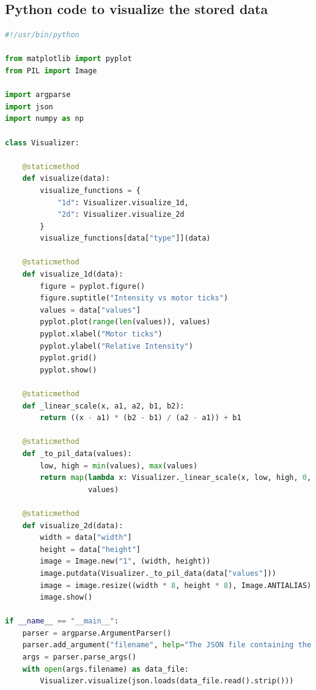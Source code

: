 \documentclass[letterpaper, 12pt]{article}
\begin{document}
\subsection{Python code to visualize the stored data}
\begin{lstlisting}[language=Python]
#!/usr/bin/python

from matplotlib import pyplot
from PIL import Image

import argparse
import json
import numpy as np

class Visualizer:

    @staticmethod
    def visualize(data):
        visualize_functions = {
            "1d": Visualizer.visualize_1d,
            "2d": Visualizer.visualize_2d
        }
        visualize_functions[data["type"]](data)

    @staticmethod
    def visualize_1d(data):
        figure = pyplot.figure()
        figure.suptitle("Intensity vs motor ticks")
        values = data["values"]
        pyplot.plot(range(len(values)), values)
        pyplot.xlabel("Motor ticks")
        pyplot.ylabel("Relative Intensity")
        pyplot.grid()
        pyplot.show()

    @staticmethod
    def _linear_scale(x, a1, a2, b1, b2):
        return ((x - a1) * (b2 - b1) / (a2 - a1)) + b1

    @staticmethod
    def _to_pil_data(values):
        low, high = min(values), max(values)
        return map(lambda x: Visualizer._linear_scale(x, low, high, 0, 255),
                   values)

    @staticmethod
    def visualize_2d(data):
        width = data["width"]
        height = data["height"]
        image = Image.new("1", (width, height))
        image.putdata(Visualizer._to_pil_data(data["values"]))
        image = image.resize((width * 8, height * 8), Image.ANTIALIAS)
        image.show()

if __name__ == "__main__":
    parser = argparse.ArgumentParser()
    parser.add_argument("filename", help="The JSON file containing the data")
    args = parser.parse_args()
    with open(args.filename) as data_file:
        Visualizer.visualize(json.loads(data_file.read().strip()))
\end{lstlisting}
\end{document}
